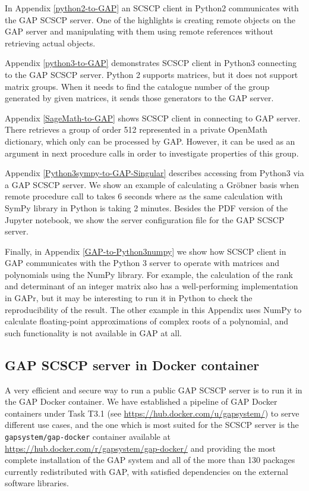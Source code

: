 \documentclass{deliverablereport}
\begin{document}
In Appendix \ref{python2-to-GAP} an SCSCP client in Python2 
communicates with the GAP SCSCP server. One of the highlights is
creating remote objects on the GAP server and manipulating
with them using remote references without retrieving actual
objects.

Appendix \ref{python3-to-GAP} demonstrates SCSCP client in 
Python3 connecting to the GAP SCSCP server. Python 2 supports
matrices, but it does not support matrix groups. When it needs
to find the catalogue number of the group generated by given
matrices, it sends those generators to the GAP server.

Appendix \ref{SageMath-to-GAP} shows SCSCP client in \Sage 
connecting to GAP server. There \Sage retrieves a group of order
512 represented in a private OpenMath dictionary, which only
can be processed by GAP. However, it can be used as an argument
in next procedure calls in order to investigate properties of 
this group.

Appendix \ref{Python3sympy-to-GAP-Singular} describes
accessing \Singular from Python3 via a GAP SCSCP server. 
We show an example of calculating a Gr\"obner basis when
remote procedure call to \Singular takes 6 seconds where
as the same calculation with SymPy library in Python is
taking 2 minutes. Besides the PDF version of the Jupyter
notebook, we show the server configuration file for the
GAP SCSCP server.

Finally, in Appendix \ref{GAP-to-Python3numpy} we show how
SCSCP client in GAP communicates with the Python 3 server
to operate with matrices and polynomials using the NumPy
library. For example, the calculation of the rank and
determinant of an integer matrix also has a well-performing
implementation in GAPr, but it may be interesting to run
it in Python to check the reproducibility of the result.
The other example in this Appendix uses NumPy to calculate
floating-point approximations of complex roots of a 
polynomial, and such functionality is not available in GAP
at all.


\subsection{GAP SCSCP server in Docker container}\label{gap-docker}

A very efficient and secure way to run a public GAP SCSCP
server is to run it in the GAP Docker container. 
We have established a pipeline of GAP Docker containers
under Task T3.1 (see \url{https://hub.docker.com/u/gapsystem/})
to serve different use cases, and the one which is most
suited for the SCSCP server is the {\tt gapsystem/gap-docker} 
container available at \url{https://hub.docker.com/r/gapsystem/gap-docker/} and
providing the most complete installation
of the GAP system and all of the more than 130 packages
currently redistributed with GAP, with satisfied dependencies
on the external software libraries.
\end{document}
